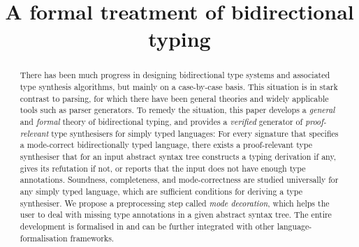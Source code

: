 \documentclass[orivec,envcountsame,envcountsect,oribibl]{llncs}
\title{A formal treatment of bidirectional typing}
\begin{document}
\maketitle

\begin{abstract}
There has been much progress in designing bidirectional type systems and associated type synthesis algorithms, but mainly on a case-by-case basis.
This situation is in stark contrast to parsing, for which there have been general theories and widely applicable tools such as parser generators.
To remedy the situation, this paper develops a \emph{general} and \emph{formal} theory of bidirectional typing, and provides a \emph{verified} generator of \emph{proof-relevant} type synthesisers for simply typed languages: For every signature that specifies a mode-correct bidirectionally typed language, there exists a proof-relevant type synthesiser that for an input abstract syntax tree constructs a typing derivation if any, gives its refutation if not, or reports that the input does not have enough type annotations.
Soundness, completeness, and mode-correctness are studied universally for any simply typed language, which are sufficient conditions for deriving a type synthesiser.
We propose a preprocessing step called \emph{mode decoration}, which helps the user to deal with missing type annotations in a given abstract syntax tree.
The entire development is formalised in \Agda and can be further integrated with other language-formalisation frameworks.
\end{abstract}













\appendix

%

\end{document}
